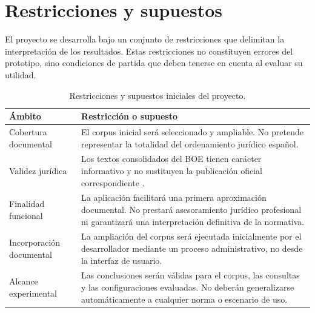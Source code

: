 \section{Restricciones y supuestos}
\label{sec:restricciones-supuestos}

El proyecto se desarrolla bajo un conjunto de restricciones que delimitan la interpretación de los resultados. Estas restricciones no constituyen errores del prototipo, sino condiciones de partida que deben tenerse en cuenta al evaluar su utilidad.

\begin{table}[htbp]
    \centering
    \small
    \renewcommand{\arraystretch}{1.2}
    \caption{Restricciones y supuestos iniciales del proyecto.}
    \label{tab:restricciones-supuestos}
    \begin{tabularx}{\textwidth}{|p{3.3cm}|X|}
        \hline
        \textbf{Ámbito} & \textbf{Restricción o supuesto} \\
        \hline
        Cobertura documental & El corpus inicial será seleccionado y ampliable. No pretende representar la totalidad del ordenamiento jurídico español. \\
        \hline
        Validez jurídica & Los textos consolidados del BOE tienen carácter informativo y no sustituyen la publicación oficial correspondiente \cite{boeLegislacionActualizada}. \\
        \hline
        Finalidad funcional & La aplicación facilitará una primera aproximación documental. No prestará asesoramiento jurídico profesional ni garantizará una interpretación definitiva de la normativa. \\
        \hline
        Incorporación documental & La ampliación del corpus será ejecutada inicialmente por el desarrollador mediante un proceso administrativo, no desde la interfaz de usuario. \\
        \hline
        Alcance experimental & Las conclusiones serán válidas para el corpus, las consultas y las configuraciones evaluadas. No deberán generalizarse automáticamente a cualquier norma o escenario de uso. \\
        \hline
    \end{tabularx}
\end{table}


